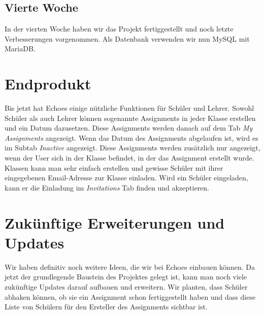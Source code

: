 \documentclass[a4paper, titlepage]{article}
\begin{document}
    \subsection{Vierte Woche}
    In der vierten Woche haben wir das Projekt fertiggestellt und noch letzte Verbesserungen vorgenommen. Als Datenbank verwenden wir nun MySQL mit
    MariaDB.

    \section{Endprodukt}
    Bis jetzt hat Echoes einige nützliche Funktionen für Schüler und Lehrer. Sowohl Schüler als auch Lehrer können sogenannte Assignments 
    in jeder Klasse erstellen und ein Datum dazusetzen. Diese Assignments werden danach auf dem Tab \emph{My Assignments} angezeigt. 
    Wenn das Datum des Assignments abgelaufen ist, wird es im Subtab \emph{Inactive} angezeigt. Diese Assignments werden zusätzlich nur angezeigt, 
    wenn der User sich in der Klasse befindet, in der das Assignment erstellt wurde. Klassen kann man sehr einfach erstellen und gewisse Schüler 
    mit ihrer eingegebenen Email-Adresse zur Klasse einladen. Wird ein Schüler eingeladen, kann er die Einladung im \emph{Invitations} Tab 
    finden und akzeptieren.
    
    \section{Zukünftige Erweiterungen und Updates}
    Wir haben definitiv noch weitere Ideen, die wir bei Echoes einbauen können. Da jetzt der grundlegende Baustein des Projektes gelegt ist, 
    kann man noch viele zukünftige Updates darauf aufbauen und erweitern. Wir planten, dass Schüler abhaken können, ob sie ein Assignment schon fertiggestellt haben und dass diese Liste von Schülern für den Ersteller des Assignments sichtbar ist.
    


    \newpage

    
    

  
\end{document}
